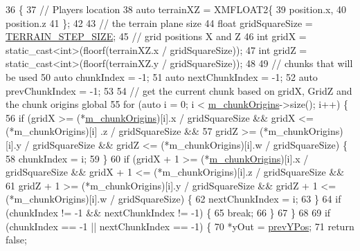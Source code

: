 \begin{DoxyCode}
36 \{
37     \textcolor{comment}{// Players location}
38     \textcolor{keyword}{auto} terrainXZ = XMFLOAT2\{
39         position.x,
40         position.z
41     \};
42 
43     \textcolor{comment}{// the terrain plane size }
44     \textcolor{keywordtype}{float} gridSquareSize = \mbox{\hyperlink{_terrain_generation_helper_8h_ad04a251ab3e1323474688977de1579e4}{TERRAIN\_STEP\_SIZE}};
45     \textcolor{comment}{// grid positions X and Z }
46     \textcolor{keywordtype}{int} gridX = \textcolor{keyword}{static\_cast<}\textcolor{keywordtype}{int}\textcolor{keyword}{>}(floorf(terrainXZ.x / gridSquareSize));
47     \textcolor{keywordtype}{int} gridZ = \textcolor{keyword}{static\_cast<}\textcolor{keywordtype}{int}\textcolor{keyword}{>}(floorf(terrainXZ.y / gridSquareSize));
48 
49     \textcolor{comment}{// chunks that will be used}
50     \textcolor{keyword}{auto} chunkIndex = -1;
51     \textcolor{keyword}{auto} nextChunkIndex = -1;
52     \textcolor{keyword}{auto} prevChunkIndex = -1;
53 
54     \textcolor{comment}{// get the current chunk based on gridX, GridZ and the chunk origins global}
55     \textcolor{keywordflow}{for} (\textcolor{keyword}{auto} i = 0; i < \mbox{\hyperlink{class_terrain_collision_helper_a49449b3d4ccf601ddca4200b5aa39b85}{m\_chunkOrigins}}->size(); i++) \{
56         \textcolor{keywordflow}{if} (gridX >= (*\mbox{\hyperlink{class_terrain_collision_helper_a49449b3d4ccf601ddca4200b5aa39b85}{m\_chunkOrigins}})[i].x / gridSquareSize && gridX <= (*m\_chunkOrigins)[i]
      .z / gridSquareSize &&
57             gridZ >= (*m\_chunkOrigins)[i].y / gridSquareSize && gridZ <= (*m\_chunkOrigins)[i].w / 
      gridSquareSize) \{
58             chunkIndex = i;
59         \}
60         \textcolor{keywordflow}{if} (gridX + 1 >= (*\mbox{\hyperlink{class_terrain_collision_helper_a49449b3d4ccf601ddca4200b5aa39b85}{m\_chunkOrigins}})[i].x / gridSquareSize && gridX + 1 <= 
      (*m\_chunkOrigins)[i].z / gridSquareSize &&
61             gridZ + 1 >= (*m\_chunkOrigins)[i].y / gridSquareSize && gridZ + 1 <= (*m\_chunkOrigins)[i].w / 
      gridSquareSize) \{
62             nextChunkIndex = i;
63         \}
64         \textcolor{keywordflow}{if} (chunkIndex != -1 && nextChunkIndex != -1) \{
65             \textcolor{keywordflow}{break};
66         \}
67     \}
68 
69     \textcolor{keywordflow}{if} (chunkIndex == -1 || nextChunkIndex == -1) \{
70         *yOut = \mbox{\hyperlink{class_terrain_collision_helper_a3418ac5abfc56f291e2ca54a8661513a}{prevYPos}};
71         \textcolor{keywordflow}{return} \textcolor{keyword}{false};

\end{DoxyCode}
